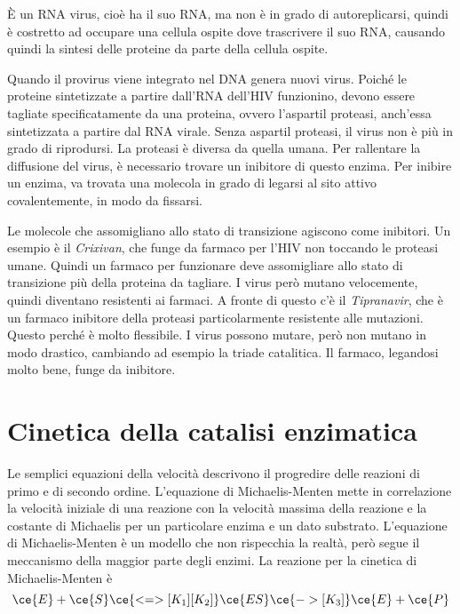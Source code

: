 È un RNA virus, cioè ha il suo RNA, ma non è in grado di autoreplicarsi, quindi è costretto ad occupare una cellula ospite dove trascrivere il suo RNA, causando quindi la sintesi delle proteine da parte della cellula ospite.


Quando il provirus viene integrato nel DNA genera nuovi virus. Poiché le proteine sintetizzate a partire dall'RNA dell'HIV funzionino, devono essere tagliate specificatamente da una proteina, ovvero l'aspartil proteasi, anch'essa sintetizzata a partire dal RNA virale.
Senza aspartil proteasi, il virus non è più in grado di riprodursi. La proteasi è diversa da quella umana. Per rallentare la diffusione del virus, è necessario trovare un inibitore di questo enzima. Per inibire un enzima, va trovata una molecola in grado di legarsi al sito attivo covalentemente, in modo da fissarsi.

Le molecole che assomigliano allo stato di transizione agiscono come inibitori. Un esempio è il \emph{Crixivan}, che funge da farmaco per l'HIV non toccando le proteasi umane. Quindi un farmaco per funzionare deve assomigliare allo stato di transizione più della proteina da tagliare.
I virus però mutano velocemente, quindi diventano resistenti ai farmaci. A fronte di questo c'è il \emph{Tipranavir}, che è un farmaco inibitore della proteasi particolarmente resistente alle mutazioni. Questo perché è molto flessibile.
I virus possono mutare, però non mutano in modo drastico, cambiando ad esempio la triade catalitica. Il farmaco, legandosi molto bene, funge da inibitore.

\clearpage

\section{Cinetica della catalisi enzimatica}

Le semplici equazioni della velocità descrivono il progredire delle reazioni di primo e di secondo ordine.
L'equazione di Michaelis-Menten mette in correlazione la velocità iniziale di una reazione con la velocità massima della reazione e la costante di Michaelis per un particolare enzima e un dato substrato.
L'equazione di Michaelis-Menten è un modello che non rispecchia la realtà, però segue il meccanismo della maggior parte degli enzimi.
La reazione per la cinetica di Michaelis-Menten è
\[
\ce{E} + \ce{S} \ce{<=>[K_1][K_2]} \ce{ES} \ce{->[K_3]} \ce{E} + \ce{P}
\]

